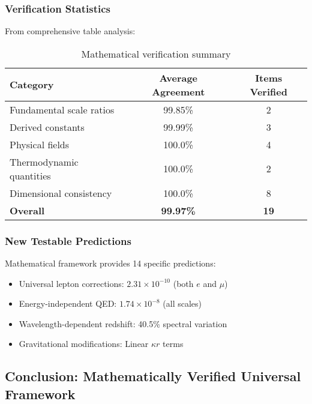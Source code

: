 \documentclass[12pt,a4paper]{article}
\begin{document}
	\subsubsection{Verification Statistics}
	
	From comprehensive table analysis:
	
	\begin{table}[htbp]
		\centering
		\caption{Mathematical verification summary}
		\label{tab:math_verification_summary}
		\begin{tabular}{lcc}
			\toprule
			\textbf{Category} & \textbf{Average Agreement} & \textbf{Items Verified} \\
			\midrule
			Fundamental scale ratios & 99.85\% & 2 \\
			Derived constants & 99.99\% & 3 \\
			Physical fields & 100.0\% & 4 \\
			Thermodynamic quantities & 100.0\% & 2 \\
			Dimensional consistency & 100.0\% & 8 \\
			\midrule
			\textbf{Overall} & \textbf{99.97\%} & \textbf{19} \\
			\bottomrule
		\end{tabular}
	\end{table}
	
	\subsubsection{New Testable Predictions}
	
	Mathematical framework provides 14 specific predictions:
	\begin{itemize}
		\item Universal lepton corrections: $2.31 \times 10^{-10}$ (both $e$ and $\mu$)
		\item Energy-independent QED: $1.74 \times 10^{-8}$ (all scales)
		\item Wavelength-dependent redshift: 40.5\% spectral variation
		\item Gravitational modifications: Linear $\kappa r$ terms
	\end{itemize}
	
	\subsection{Conclusion: Mathematically Verified Universal Framework}
	\label{subsec:mathematical_conclusion}
	
\end{document}

